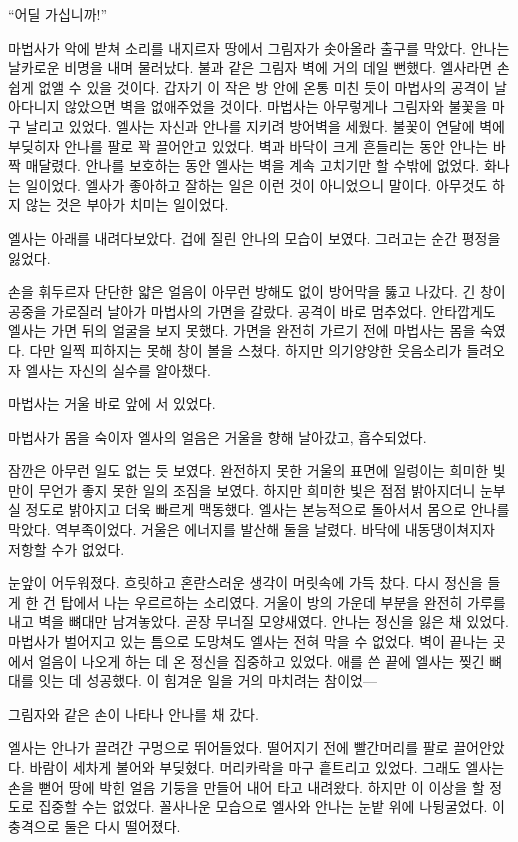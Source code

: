 ``어딜 가십니까!''

마법사가 악에 받쳐 소리를 내지르자 땅에서 그림자가 솟아올라 출구를 막았다. 안나는 날카로운 비명을 내며 물러났다. 불과 같은 그림자 벽에 거의 데일 뻔했다. 엘사라면 손쉽게 없앨 수 있을 것이다. 갑자기 이 작은 방 안에 온통 미친 듯이 마법사의 공격이 날아다니지 않았으면 벽을 없애주었을 것이다. 마법사는 아무렇게나 그림자와 불꽃을 마구 날리고 있었다. 엘사는 자신과 안나를 지키려 방어벽을 세웠다. 불꽃이 연달에 벽에 부딪히자 안나를 팔로 꽉 끌어안고 있었다. 벽과 바닥이 크게 흔들리는 동안 안나는 바짝 매달렸다. 안나를 보호하는 동안 엘사는 벽을 계속 고치기만 할 수밖에 없었다. 화나는 일이었다. 엘사가 좋아하고 잘하는 일은 이런 것이 아니었으니 말이다. 아무것도 하지 않는 것은 부아가 치미는 일이었다.

엘사는 아래를 내려다보았다. 겁에 질린 안나의 모습이 보였다. 그러고는 순간 평정을 잃었다.

손을 휘두르자 단단한 얇은 얼음이 아무런 방해도 없이 방어막을 뚫고 나갔다. 긴 창이 공중을 가로질러 날아가 마법사의 가면을 갈랐다. 공격이 바로 멈추었다. 안타깝게도 엘사는 가면 뒤의 얼굴을 보지 못했다. 가면을 완전히 가르기 전에 마법사는 몸을 숙였다. 다만 일찍 피하지는 못해 창이 볼을 스쳤다. 하지만 의기양양한 웃음소리가 들려오자 엘사는 자신의 실수를 알아챘다.

마법사는 거울 바로 앞에 서 있었다.

마법사가 몸을 숙이자 엘사의 얼음은 거울을 향해 날아갔고, 흡수되었다.

잠깐은 아무런 일도 없는 듯 보였다. 완전하지 못한 거울의 표면에 일렁이는 희미한 빛만이 무언가 좋지 못한 일의 조짐을 보였다. 하지만 희미한 빛은 점점 밝아지더니 눈부실 정도로 밝아지고 더욱 빠르게 맥동했다. 엘사는 본능적으로 돌아서서 몸으로 안나를 막았다. 역부족이었다. 거울은 에너지를 발산해 둘을 날렸다. 바닥에 내동댕이쳐지자 저항할 수가 없었다.

눈앞이 어두워졌다. 흐릿하고 혼란스러운 생각이 머릿속에 가득 찼다. 다시 정신을 들게 한 건 탑에서 나는 우르르하는 소리였다. 거울이 방의 가운데 부분을 완전히 가루를 내고 벽을 뼈대만 남겨놓았다. 곧장 무너질 모양새였다. 안나는 정신을 잃은 채 있었다. 마법사가 벌어지고 있는 틈으로 도망쳐도 엘사는 전혀 막을 수 없었다. 벽이 끝나는 곳에서 얼음이 나오게 하는 데 온 정신을 집중하고 있었다. 애를 쓴 끝에 엘사는 찢긴 뼈대를 잇는 데 성공했다. 이 힘겨운 일을 거의 마치려는 참이었—

그림자와 같은 손이 나타나 안나를 채 갔다.

엘사는 안나가 끌려간 구멍으로 뛰어들었다. 떨어지기 전에 빨간머리를 팔로 끌어안았다. 바람이 세차게 불어와 부딪혔다. 머리카락을 마구 흩트리고 있었다. 그래도 엘사는 손을 뻗어 땅에 박힌 얼음 기둥을 만들어 내어 타고 내려왔다. 하지만 이 이상을 할 정도로 집중할 수는 없었다. 꼴사나운 모습으로 엘사와 안나는 눈밭 위에 나뒹굴었다. 이 충격으로 둘은 다시 떨어졌다.

